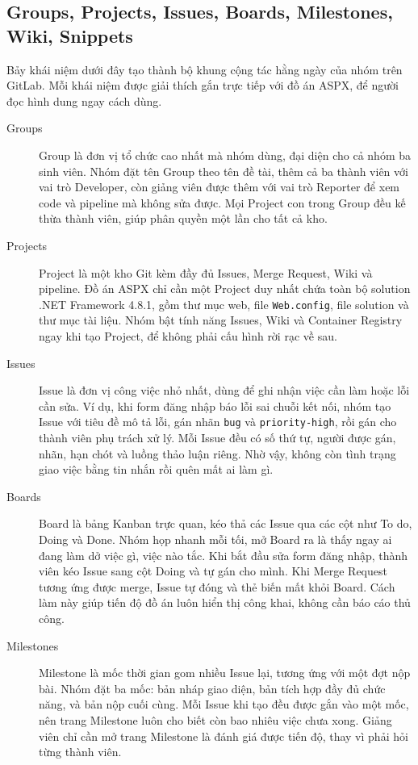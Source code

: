 \subsection{Groups, Projects, Issues, Boards, Milestones, Wiki, Snippets}
\label{subsec:c51-cong-cu-cong-tac}

Bảy khái niệm dưới đây tạo thành bộ khung cộng tác hằng ngày của nhóm trên GitLab.
Mỗi khái niệm được giải thích gắn trực tiếp với đồ án ASPX, để người đọc hình dung ngay cách dùng.

\begin{description}
\item[Groups] Group là đơn vị tổ chức cao nhất mà nhóm dùng, đại diện cho cả nhóm ba sinh viên.
Nhóm đặt tên Group theo tên đề tài, thêm cả ba thành viên với vai trò Developer,
còn giảng viên được thêm với vai trò Reporter để xem code và pipeline mà không sửa được.
Mọi Project con trong Group đều kế thừa thành viên, giúp phân quyền một lần cho tất cả kho.

\item[Projects] Project là một kho Git kèm đầy đủ Issues, Merge Request, Wiki và pipeline.
Đồ án ASPX chỉ cần một Project duy nhất chứa toàn bộ solution .NET Framework 4.8.1,
gồm thư mục web, file \texttt{Web.config}, file solution và thư mục tài liệu.
Nhóm bật tính năng Issues, Wiki và Container Registry ngay khi tạo Project,
để không phải cấu hình rời rạc về sau.

\item[Issues] Issue là đơn vị công việc nhỏ nhất, dùng để ghi nhận việc cần làm hoặc lỗi cần sửa.
Ví dụ, khi form đăng nhập báo lỗi sai chuỗi kết nối, nhóm tạo Issue với tiêu đề mô tả lỗi,
gán nhãn \texttt{bug} và \texttt{priority-high}, rồi gán cho thành viên phụ trách xử lý.
Mỗi Issue đều có số thứ tự, người được gán, nhãn, hạn chót và luồng thảo luận riêng.
Nhờ vậy, không còn tình trạng giao việc bằng tin nhắn rồi quên mất ai làm gì.

\item[Boards] Board là bảng Kanban trực quan, kéo thả các Issue qua các cột như To do, Doing và Done.
Nhóm họp nhanh mỗi tối, mở Board ra là thấy ngay ai đang làm dở việc gì, việc nào tắc.
Khi bắt đầu sửa form đăng nhập, thành viên kéo Issue sang cột Doing và tự gán cho mình.
Khi Merge Request tương ứng được merge, Issue tự đóng và thẻ biến mất khỏi Board.
Cách làm này giúp tiến độ đồ án luôn hiển thị công khai, không cần báo cáo thủ công.

\item[Milestones] Milestone là mốc thời gian gom nhiều Issue lại, tương ứng với một đợt nộp bài.
Nhóm đặt ba mốc: bản nháp giao diện, bản tích hợp đầy đủ chức năng, và bản nộp cuối cùng.
Mỗi Issue khi tạo đều được gắn vào một mốc, nên trang Milestone luôn cho biết còn bao nhiêu việc chưa xong.
Giảng viên chỉ cần mở trang Milestone là đánh giá được tiến độ, thay vì phải hỏi từng thành viên.


\end{description}
